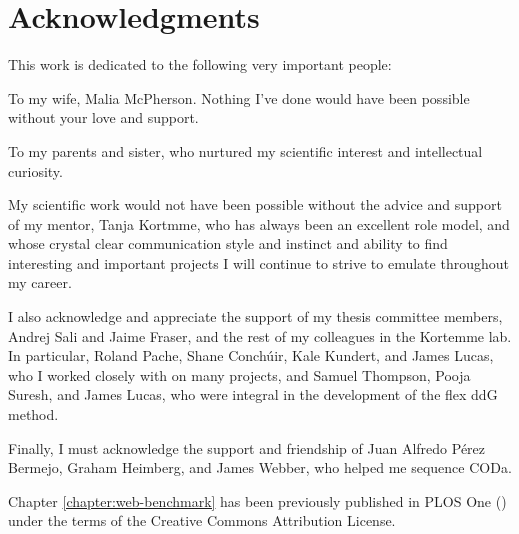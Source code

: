 \chapter*{Acknowledgments}

This work is dedicated to the following very important people:

To my wife, Malia McPherson. Nothing I've done would have been possible without your love and support.

To my parents and sister, who nurtured my scientific interest and intellectual curiosity.

My scientific work would not have been possible without the advice and support of my mentor, Tanja Kortmme, who has always been an excellent role model, and whose crystal clear communication style and instinct and ability to find interesting and important projects I will continue to strive to emulate throughout my career.

I also acknowledge and appreciate the support of my thesis committee members, Andrej Sali and Jaime Fraser, and the rest of my colleagues in the Kortemme lab.
In particular, Roland Pache, Shane Conch{\'u}ir, Kale Kundert, and James Lucas, who I worked closely with on many projects, and Samuel Thompson, Pooja Suresh, and James Lucas, who were integral in the development of the flex ddG method.

Finally, I must acknowledge the support and friendship of Juan Alfredo Pérez Bermejo, Graham Heimberg, and James Webber, who helped me sequence CODa.

Chapter \ref{chapter:web-benchmark} has been previously published in PLOS One (\citet{conchuir_web_2015}) under the terms of the Creative Commons Attribution License.
